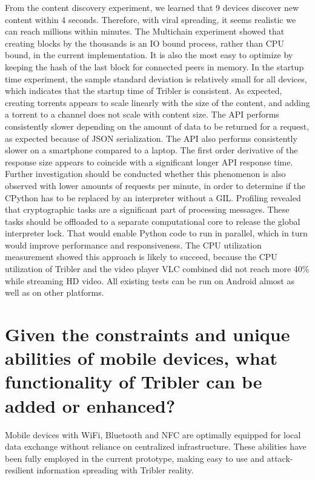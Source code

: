 From the content discovery experiment, we learned that 9 devices discover new content within 4 seconds.
Therefore, with viral spreading, it seems realistic we can reach millions within minutes.
The Multichain experiment showed that creating blocks by the thousands is an IO bound process, rather than CPU bound, in the current implementation.
It is also the most easy to optimize by keeping the hash of the last block for connected peers in memory.
In the startup time experiment, the sample standard deviation is relatively small for all devices, which indicates that the startup time of Tribler is consistent.
As expected, creating torrents appears to scale linearly with the size of the content, and adding a torrent to a channel does not scale with content size.
The API performs consistently slower depending on the amount of data to be returned for a request, as expected because of JSON serialization.
The API also performs consistently slower on a smartphone compared to a laptop.
The first order derivative of the response size appears to coincide with a significant longer API response time.
Further investigation should be conducted whether this phenomenon is also observed with lower amounts of requests per minute, in order to determine if the CPython has to be replaced by an interpreter without a GIL.
Profiling revealed that cryptographic tasks are a significant part of processing messages.
These tasks should be offloaded to a separate computational core to release the global interpreter lock.
That would enable Python code to run in parallel, which in turn would improve performance and responsiveness.
The CPU utilization measurement showed this approach is likely to succeed, because the CPU utilization of Tribler and the video player VLC combined did not reach more 40\% while streaming HD video.
All existing tests can be run on Android almost as well as on other platforms.







\section{Given the constraints and unique abilities of mobile devices, what functionality of Tribler can be added or enhanced?}
Mobile devices with WiFi, Bluetooth and NFC are optimally equipped for local data exchange without reliance on centralized infrastructure.
These abilities have been fully employed in the current prototype, making easy to use and attack-resilient information spreading with Tribler reality.

